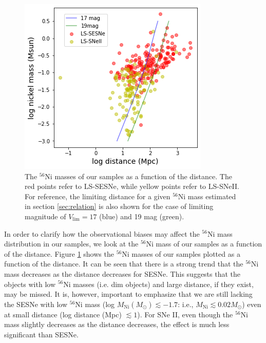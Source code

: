 \documentclass[twocolumn, linenumbers]{aastex62}
\begin{document}
\begin{figure}[htbp]
	\includegraphics[width=\columnwidth]{Ni_vs_distance.png}
    \caption{The $^{56}$Ni masses of our samples as a function of the distance. The red points refer to LS-SESNe, while yellow points refer to LS-SNeII. For reference, the limiting distance for a given $^{56}$Ni mass estimated in section \ref{sec:relation} is also shown for the case of limiting magnitude of $V_{\mathrm{lim}} = 17$ (blue) and 19 mag (green).}
     \label{Ni_mass_vs_distance}
\end{figure}
In order to clarify how the observational biases may affect the $^{56}$Ni mass distribution in our samples, we look at the $^{56}$Ni mass of our samples as a function of the distance.
Figure \ref{Ni_mass_vs_distance} shows the $^{56}$Ni masses of our samples plotted as a function of the distance. It can be seen that there is a strong trend that the $^{56}$Ni mass decreases as the distance decreases for SESNe. This suggests that the objects with low $^{56}$Ni masses (i.e. dim objects) and large distance, if they exist, may be missed. It is, however, important to emphasize that we are still lacking the SESNe with low $^{56}$Ni mass (log $M_{\mathrm{Ni}} (M_{\odot}) \lesssim -1.7$: i.e., $M_{\mathrm{Ni}} \lesssim 0.02 M_{\odot}$) even at small distance (log distance (Mpc) $\lesssim 1$). For SNe II, even though the $^{56}$Ni mass slightly decreases as the distance decreases, the effect is much less significant than SESNe.
\end{document}
